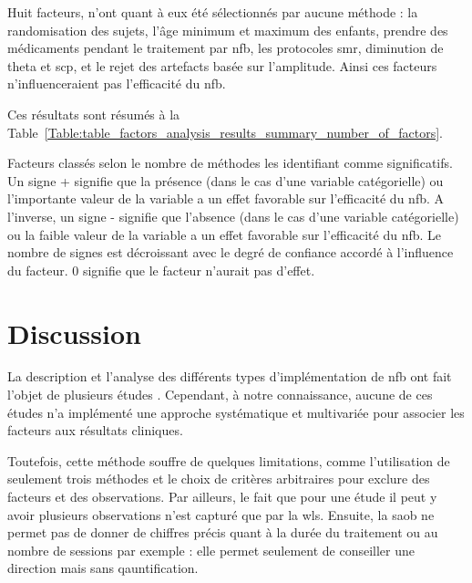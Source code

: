 Huit facteurs, n'ont quant à eux été sélectionnés par aucune méthode : la randomisation des sujets, l'âge minimum et maximum des enfants, prendre des 
médicaments pendant le traitement par \gls{nfb}, les protocoles \gls{smr}, diminution de theta et \gls{scp}, et le rejet
des artefacts basée sur l'amplitude. Ainsi ces facteurs n'influenceraient pas l'efficacité du \gls{nfb}. 

Ces résultats sont résumés à la Table~\ref{Table:table_factors_analysis_results_summary_number_of_factors}.

\begin{table}[h!]
  \centering
  \caption{Facteurs classés selon le nombre de méthodes les identifiant comme significatifs. Un signe + signifie que la présence (dans le cas d'une variable catégorielle) ou l'importante valeur
	de la variable a un effet favorable sur l'efficacité du \gls{nfb}. A l'inverse, un signe - signifie que l'absence (dans le cas d'une variable catégorielle) ou la faible valeur
	de la variable a un effet favorable sur l'efficacité du \gls{nfb}. Le nombre de signes est décroissant avec le degré de confiance accordé à l'influence du facteur. 0 signifie 
	que le facteur n'aurait pas d'effet.}
  
  \label{Table:table_factors_analysis_results_summary_number_of_factors}
\end{table}

\section{Discussion}

La description et l'analyse des différents types d'implémentation de \gls{nfb} ont fait l'objet de plusieurs études \citep{Arns2014, 
Jeunet2018, Arns2009, Cortese2016, Alkoby2017, Rogala2016, Enriquez2017}. Cependant, à notre connaissance, aucune de ces études n'a implémenté une approche systématique et 
multivariée pour associer les facteurs aux résultats cliniques. 

Toutefois, cette méthode souffre de quelques limitations, comme 
l'utilisation de seulement trois méthodes et le choix de critères arbitraires pour exclure des facteurs et des observations. Par ailleurs, le fait que pour une étude il peut y 
avoir plusieurs observations n'est capturé que par la \gls{wls}. Ensuite, la \gls{saob} ne permet pas de donner de chiffres précis quant à la durée du traitement ou au 
nombre de sessions par exemple : elle permet seulement de conseiller une direction mais sans qauntification.

